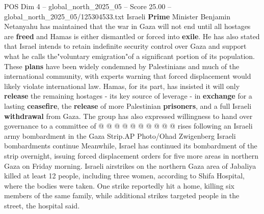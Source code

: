 \begin{textsample}{POS Dim 4 – global\_north\_2025\_05 – Score 25.00 – global\_north\_2025\_05/125304533.txt}
Israeli \textbf{Prime} Minister Benjamin Netanyahu has maintained that the war in Gaza will not end until all hostages are \textbf{freed} and Hamas is either dismantled or forced into \textbf{exile}.
He has also stated that Israel intends to retain indefinite security control over Gaza and support what he calls the"voluntary emigration"of a significant portion of its population.
These \textbf{plans} have been widely condemned by Palestinians and much of the international community, with experts warning that forced displacement would likely violate international law.
Hamas, for its part, has insisted it will only \textbf{release} the remaining hostages - its key source of leverage - in \textbf{exchange} for a lasting \textbf{ceasefire}, the \textbf{release} of more Palestinian \textbf{prisoners}, and a full Israeli \textbf{withdrawal} from Gaza.
The group has also expressed willingness to hand over governance to a committee of @ @ @ @ @ @ @ @ @ @ rises following an Israeli army bombardment in the Gaza Strip.AP Photo/Ohad Zwigenberg Israeli bombardments continue Meanwhile, Israel has continued its bombardment of the strip overnight, issuing forced displacement orders for five more areas in northern Gaza on Friday morning.
Israeli airstrikes on the northern Gaza area of Jabaliya killed at least 12 people, including three women, according to Shifa Hospital, where the bodies were taken.
One strike reportedly hit a home, killing six members of the same family, while additional strikes targeted people in the street, the hospital said.

\end{textsample}
